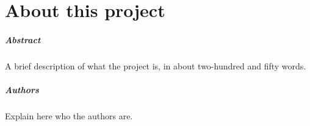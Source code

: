 \chapter*{About this project}
\paragraph{Abstract}
A brief description of what the project is, in about two-hundred and fifty words.

\paragraph{Authors}
Explain here who the authors are.